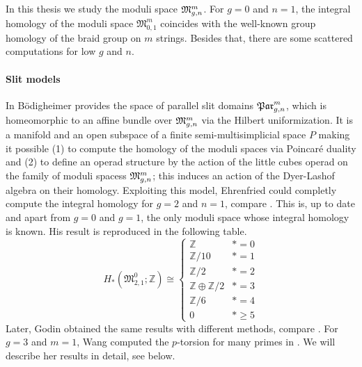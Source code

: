 In this thesis we study the moduli space $\mathfrak{M}^m_{g,n}$.
For $g=0$ and $n=1$, the integral homology of the moduli space $\mathfrak{M}_{0,1}^m$ coincides with the well-known group homology of the braid group on $m$ strings.
Besides that, there are some scattered computations for low $g$ and $n$.

\paragraph{Slit models}
In \cite{Boedigheimer19901} Bödigheimer provides the space of parallel slit domains $\mathfrak{Par}_{g,n}^m$, which is homeomorphic to an affine bundle over $\mathfrak{M}^m_{g,n}$ via the Hilbert uniformization.
It is a manifold and an open subspace of a finite semi-multisimplicial space $P$ making it possible
(1) to compute the homology of the moduli spaces via Poincaré duality and
(2) to define an operad structure by the action of the little cubes operad on the family of moduli spacess $\mathfrak{M}^m_{g,n}$;
this induces an action of the Dyer-Lashof algebra on their homology.
Exploiting this model, Ehrenfried could completly compute the integral homology for $g=2$ and $n=1$, compare \cite{Ehrenfried1997}.
This is, up to date and apart from $g=0$ and $g=1$, the only moduli space whose integral homology is known. 
His result is reproduced in the following table.
\[
    H_\ast( \mathfrak{M}_{2,1}^0; \mathbb Z) \cong
        \begin{cases}
            \mathbb Z                           & \ast = 0\\
            \mathbb Z/10                        & \ast = 1\\
            \mathbb Z/2                         & \ast = 2\\
            \mathbb Z \oplus \mathbb Z/2        & \ast = 3\\
            \mathbb Z/6                         & \ast = 4\\
            0                                   & \ast \ge 5
        \end{cases}
\]
Later, Godin obtained the same results with different methods, compare \cite{Godin2007}.
For $g=3$ and $m=1$, Wang computed the $p$-torsion for many primes in \cite{Wang201102}.
We will describe her results in detail, see below.

